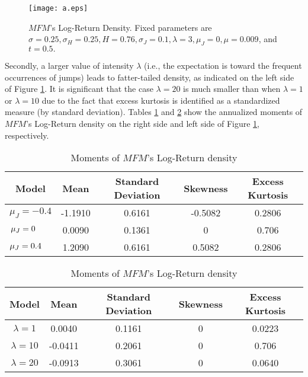 \documentclass[a4paper,11pt]{amsart}
\numberwithin{equation}{section}
\theoremstyle{definition}
\theoremstyle{plain}
\theoremstyle{definition}
\newcommand{\1}{\mathbf{1}}
\begin{document}
\begin{figure}[H]
  \centering
          \texttt{[image: a.eps]}

  \caption{$MFM$'s Log-Return Density. Fixed parameters are $\sigma=0.25,\sigma_H=0.25,H=0.76,\sigma_J=0.1,\lambda=3,\mu_J=0,\mu=0.009$, and
$t=0.5.$}
\label{fig:1}
\end{figure}

Secondly, a larger value of intensity $\lambda$ (i.e., the expectation is toward the frequent occurrences of jumps) leads to fatter-tailed density, as indicated on the left side of Figure \ref{fig:1}. It is significant that the case  $\lambda=20$ is much smaller than when $\lambda=1$ or $\lambda=10$ due to the fact that  excess kurtosis is identified as a standardized measure (by standard deviation). Tables \ref{table:1} and \ref{table:2} show the annualized moments of $MFM$'s Log-Return density on the right side and left side of Figure \ref{fig:1}, respectively.
\begin{center}
\begin{table}[H] \caption{ Moments of $MFM$'s Log-Return density}

\begin{tabular}{|ccccc|} \hline
Model & Mean& Standard Deviation& Skewness& Excess Kurtosis \\
\hline
$\mu_J=-0.4$ &    -1.1910  &  0.6161 & -0.5082  & 0.2806\\
$\hspace{-6mm}\mu_J=0   $    &     0.0090  &  0.1361 &   0      &  0.706\\
$\hspace{-4mm}\mu_J=0.4$  &    1.2090   &  0.6161 & 0.5082  & 0.2806\\

\hline

\end{tabular}
\label{table:1}
\end{table}
\end{center}

\begin{center}
\begin{table}[H] \caption{ Moments of $MFM$'s Log-Return density }

\begin{tabular}{|ccccc|} \hline
Model & Mean& Standard Deviation& Skewness& Excess Kurtosis \\
\hline
$\lambda=1$     &    0.0040   &  0.1161 &   0   &  0.0223\\
$\lambda=10$    &    -0.0411  &  0.2061 &   0   &  0.706\\
$\lambda=20$    &    -0.0913  &  0.3061 &    0  &  0.0640\\

\hline

\end{tabular}
\label{table:2}
\end{table}
\end{center}
\end{document}
